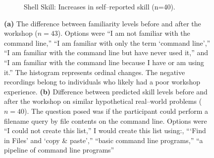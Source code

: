 \documentclass[10pt, twocolumn]{article}
\begin{document}
\begin{figure}
\begin{subfigure}[t]{0.47\columnwidth}
		\caption{Shell Skill: Increases in self--reported skill (n=40).}
		\label{shellSkill}
	\end{subfigure}
	\caption{
	    \textbf{(a)} The difference between familiarity levels before and after the workshop ($n=43$). 
	    Options were ``I am not familiar with the command line,'' 
	    ``I am familiar with only the term `command line','' 
	    ``I am familiar with the command line but have never used it,'' 
	    and ``I am familiar with the command line because I have or am using it.'' 
	    The histogram represents ordinal changes. 
	    The negative recordings belong to individuals
	    who likely had a poor workshop experience.
	    \textbf{(b)} Difference between predicted skill levels 
	    before and after the workshop on similar hypothetical real--world problems ($n=40$). 
	    The question posed was if the participant could perform a filename query by file contents on the command line. 
	    Options were ``I could not create this list,'' 
	    I would create this list using:, 
	    ```Find in Files' and `copy \& paste','' 
	    ``basic command line programs,'' 
	    ``a pipeline of command line programs''
    }
	\label{shellFamiliarityAndSkill}
\end{figure}
\end{document}
